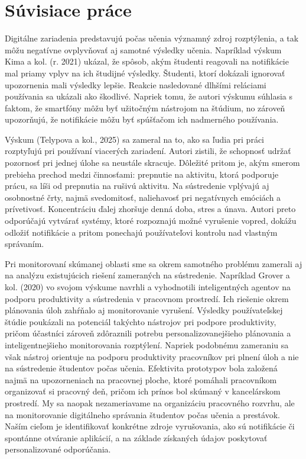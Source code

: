 \documentclass[11pt,a4paper,slovak]{article}
\begin{document}
\section{Súvisiace práce}

Digitálne zariadenia predstavujú počas učenia významný zdroj rozptýlenia, a tak môžu negatívne ovplyvňovať aj samotné výsledky učenia. Napríklad výskum Kima a kol. (r. 2021) ukázal, že spôsob, akým študenti reagovali na notifikácie mal priamy vplyv na ich študijné výsledky. Študenti, ktorí dokázali ignorovať upozornenia mali výsledky lepšie. Reakcie nasledované dlhšími reláciami používania sa ukázali ako škodlivé. Napriek tomu, že autori výskumu súhlasia s faktom, že smartfóny môžu byť užitočným nástrojom na štúdium, no zároveň upozorňujú, že notifikácie môžu byť spúšťačom ich nadmerného používania. \cite[str.~18:20]{Kim2021}

Výskum (Telypova a kol., 2025) sa zameral na to, ako sa ľudia pri práci rozptyľujú pri používaní viacerých zariadení. Autori zistili, že schopnosť udržať pozornosť pri jednej úlohe sa neustále skracuje. Dôležité pritom je, akým smerom prebieha prechod medzi činnosťami: prepnutie na aktivitu, ktorá podporuje prácu, sa líši od prepnutia na rušivú aktivitu. Na sústredenie vplývajú aj osobnostné črty, najmä svedomitosť, naliehavosť pri negatívnych emóciách a prívetivosť. Koncentráciu ďalej zhoršuje denná doba, stres a únava. Autori preto odporúčajú vytvárať systémy, ktoré rozpoznajú možné vyrušenie vopred, dokážu odložiť notifikácie a pritom ponechajú používateľovi kontrolu nad vlastným správaním. \cite[conclusion]{10.1145/3729176.3729198}

Pri monitorovaní skúmanej oblasti sme sa okrem samotného problému zamerali aj na analýzu existujúcich riešení zameraných na sústredenie. Napríklad Grover a kol. (2020) vo svojom výskume navrhli a vyhodnotili inteligentných agentov na podporu produktivity a sústredenia v pracovnom prostredí. Ich riešenie okrem plánovania úloh zahŕňalo aj monitorovanie vyrušení. Výsledky používateľskej štúdie poukázali na potenciál takýchto nástrojov pri podpore produktivity, pričom účastníci zároveň zdôraznili potrebu personalizovanejšieho plánovania a inteligentnejšieho monitorovania rozptýlení. \cite{10.1145/3377325.3377507} Napriek podobnému zameraniu sa však nástroj orientuje na podporu produktivity pracovníkov pri plnení úloh a nie na sústredenie študentov počas učenia. Efektivita prototypov bola založená najmä na upozorneniach na pracovnej ploche, ktoré pomáhali pracovníkom organizovať si pracovný deň, pričom ich prínos bol skúmaný v kancelárskom prostredí. \cite{10.1145/3377325.3377507}  My sa naopak nezameriavame na organizáciu pracovného rozvrhu, ale na monitorovanie digitálneho správania študentov počas učenia a prestávok. Naším cieľom je identifikovať konkrétne zdroje vyrušovania, ako sú notifikácie či spontánne otváranie aplikácií, a na základe získaných údajov poskytovať personalizované odporúčania.
\end{document}
